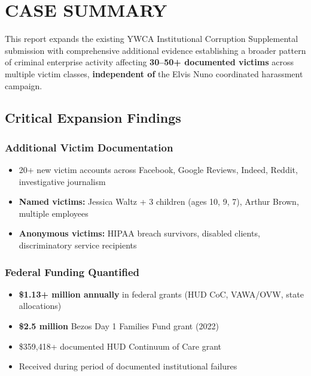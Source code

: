 \documentclass[11pt,letterpaper]{article}
\begin{document}
\vspace{0.4in}

\tableofcontents
\newpage

\section{CASE SUMMARY}

This report expands the existing YWCA Institutional Corruption Supplemental submission with comprehensive additional evidence establishing a broader pattern of criminal enterprise activity affecting \textbf{30--50+ documented victims} across multiple victim classes, \textbf{independent of} the Elvis Nuno coordinated harassment campaign.

\subsection{Critical Expansion Findings}

\subsubsection{Additional Victim Documentation}
\begin{itemize}[leftmargin=*]
\item 20+ new victim accounts across Facebook, Google Reviews, Indeed, Reddit, investigative journalism
\item \textbf{Named victims:} Jessica Waltz + 3 children (ages 10, 9, 7), Arthur Brown, multiple employees
\item \textbf{Anonymous victims:} HIPAA breach survivors, disabled clients, discriminatory service recipients
\end{itemize}

\subsubsection{Federal Funding Quantified}
\begin{itemize}[leftmargin=*]
\item \textbf{\$1.13+ million annually} in federal grants (HUD CoC, VAWA/OVW, state allocations)
\item \textbf{\$2.5 million} Bezos Day 1 Families Fund grant (2022)
\item \$359,418+ documented HUD Continuum of Care grant
\item Received during period of documented institutional failures
\end{itemize}
\end{document}
